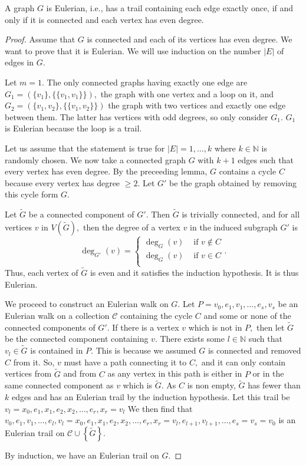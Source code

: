 
\begin{theorem}
	A graph $G$ is Eulerian, i.e., has a trail containing each edge exactly once, if and only if it is connected and each vertex has even degree.
\end{theorem}
\begin{proof}
	Assume that $G$ is connected and each of its vertices has even degree. We want to prove that it is Eulerian. We will use induction on the number $ \lvert E \rvert$ of edges in $G.$

	Let $m = 1.$ The only connected graphs having exactly one edge are $ G_1 =  ( \{v_1\}, \{\{v_1,v_1\}\} ),$ the graph with one vertex and a loop on it, and $G_2 = ( \{v_1, v_2\}, \{\{v_1,v_2\}\})$ the graph with two vertices and exactly one edge between them. The latter has vertices with odd degrees, so only consider $G_1.$
$G_1$ is Eulerian because the loop is a trail.

Let us assume that the statement is true for $ \lvert E \rvert = 1, \dotsc, k$ where $k \in \mathbb{N}$ is randomly chosen.
We now take a connected graph $G$ with $k+1$ edges such that every vertex has even degree.
By the preceeding lemma, $G$ contains a cycle $C$ because every vertex has degree $\geq 2.$
Let $G'$ be the graph obtained by removing this cycle form $G.$

Let $\tilde{G}$ be a connected component of $G'.$
Then $\tilde{G}$ is trivially connected, and for all vertices $v$ in $V(\tilde{G}),$
then the degree of a vertex $v$ in the induced subgraph $G'$ is $$ \deg_{G'}(v) =
\begin{cases}
	\deg_G(v) & \text{ if } v \not \in C \\
	\deg_G(v) & \text{ if } v \in C \\
\end{cases}.$$
Thus, each vertex of $\tilde{G}$ is even and it satisfies the induction hypothesis.
It is thus Eulerian.

We proceed to construct an Eulerian walk on $G.$
Let $P = v_0, e_1, v_1, \dotsc, e_s, v_s$ be an Eulerian walk on a collection $ \mathcal{C}$
containing
the cycle $C$ and some or none of the connected components of $G'.$
If there is a vertex $v$ which is not in $P,$ then let $\tilde{G}$ be the connected component 
containing $v.$
There exists some $l \in \mathbb{N}$ such that $v_l \in \tilde{G}$ is contained in $P.$
This is because we assumed $G$ is connected and removed $C$ from it.
So, $v$ must have a path connecting it to $C,$ and it can only contain vertices
from $\tilde{G}$ and from $C$ as any vertex in this path is either in $P$ 
or in the same connected component as $v$ which is $\tilde{G}.$
As $C$ is non empty, $\tilde{G}$ has fewer than $k$ edges and has an Eulerian trail
by the induction hypothesis. Let this trail be 
$ v_l = x_0, e_1, x_1, e_2, x_2, \dotsc, e_r, x_r = v_l$
We then find that 
$  v_0, e_1, v_1, \dotsc, e_l,v_l = x_0, e_1, x_1, e_2, x_2, \dotsc, e_r, x_r = v_l, e_{l+1}, v_{l+1}, \dotsc, 
e_s = v_s = v_0$
is an Eulerian trail on $\mathcal{C} \cup \left\{ \tilde{G} \right\}.$

By induction, we have an Eulerian trail on $G.$

\end{proof}

